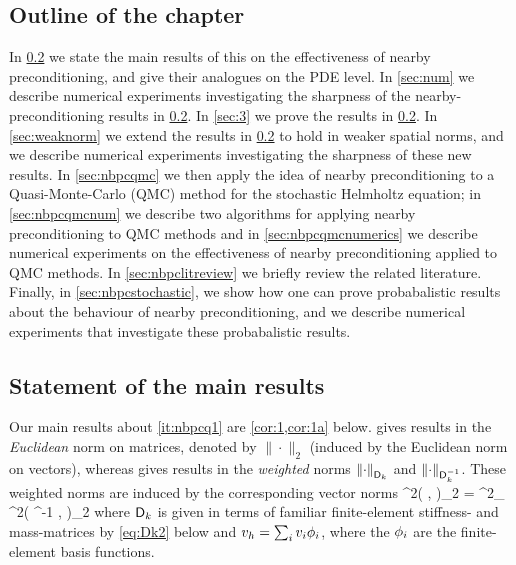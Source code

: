  \subsection{Outline of the chapter}%
In \cref{sec:main} we state the main results of this  on the effectiveness of nearby preconditioning, and give their analogues on the PDE level. In \cref{sec:num} we describe numerical experiments investigating the sharpness of the nearby-preconditioning results in \cref{sec:main}. In \cref{sec:3} we prove the results in \cref{sec:main}. In \cref{sec:weaknorm} we extend the results in \cref{sec:main} to hold in weaker spatial norms, and we describe numerical experiments investigating the sharpness of these new results. In \cref{sec:nbpcqmc} we then apply the idea of nearby preconditioning to a Quasi-Monte-Carlo (QMC) method for the stochastic Helmholtz equation; in \cref{sec:nbpcqmcnum} we describe two algorithms for applying nearby preconditioning to QMC methods and in \cref{sec:nbpcqmcnumerics} we describe numerical experiments on the effectiveness of nearby preconditioning applied to QMC methods. In \cref{sec:nbpclitreview} we briefly review the related literature. Finally, in \cref{sec:nbpcstochastic}, we show how one can prove probabalistic results about the behaviour of nearby preconditioning, and we describe numerical experiments that investigate these probabalistic results.

\subsection{Statement of the main results}\label{sec:main}
Our main results about \cref{it:nbpcq1} are \cref{cor:1,cor:1a} below.  gives results in the \emph{Euclidean} norm on matrices, denoted by $\|\cdot\|_2$ (induced by the Euclidean norm on vectors), whereas  gives results in the \emph{weighted} norms $\NDmatk{\cdot}$ and $\NDmatkI{\cdot}$. These weighted norms are induced by the corresponding vector norms
\beq\label{eq:Dk}
\NDmatk{\vvec}^2\de \big( \Dmatk \vvec, \vvec\big)_2 = %
^2_{\HokD}
\quad \tand
\quad \NDmatkI{\vvec}^2\de \big( \Dmatk^{-1} \vvec, \vvec\big)_2 %
\eeq
where $\mathsf{D}_{k}$ is given in terms of familiar finite-element stiffness- and mass-matrices by \cref{eq:Dk2} below and $v_{h} =\sum_i v_{i} \phi_{i}$, where the $\phi_{i}$ are the finite-element basis functions.

